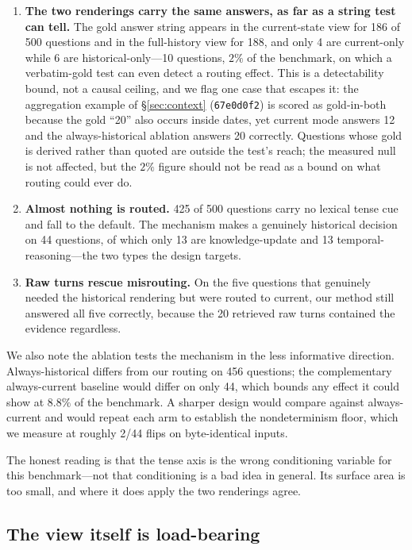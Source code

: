 \documentclass[11pt]{article}
\begin{document}
\begin{enumerate}
\item \textbf{The two renderings carry the same answers, as far as a string test can tell.} The gold answer string appears in the current-state view for 186 of 500 questions and in the full-history view for 188, and only 4 are current-only while 6 are historical-only---10 questions, $2\%$ of the benchmark, on which a verbatim-gold test can even detect a routing effect. This is a detectability bound, not a causal ceiling, and we flag one case that escapes it: the aggregation example of \S\ref{sec:context} (\texttt{67e0d0f2}) is scored as gold-in-both because the gold ``20'' also occurs inside dates, yet current mode answers 12 and the always-historical ablation answers 20 correctly. Questions whose gold is derived rather than quoted are outside the test's reach; the measured null is not affected, but the $2\%$ figure should not be read as a bound on what routing could ever do.
\item \textbf{Almost nothing is routed.} 425 of 500 questions carry no lexical tense cue and fall to the default. The mechanism makes a genuinely historical decision on 44 questions, of which only 13 are knowledge-update and 13 temporal-reasoning---the two types the design targets.
\item \textbf{Raw turns rescue misrouting.} On the five questions that genuinely needed the historical rendering but were routed to current, our method still answered all five correctly, because the 20 retrieved raw turns contained the evidence regardless.
\end{enumerate}

We also note the ablation tests the mechanism in the less informative direction. Always-historical differs from our routing on 456 questions; the complementary always-current baseline would differ on only 44, which bounds any effect it could show at $8.8\%$ of the benchmark. A sharper design would compare against always-current and would repeat each arm to establish the nondeterminism floor, which we measure at roughly 2/44 flips on byte-identical inputs.

The honest reading is that the tense axis is the wrong conditioning variable for this benchmark---not that conditioning is a bad idea in general. Its surface area is too small, and where it does apply the two renderings agree.

\subsection{The view itself is load-bearing}
\label{sec:view}
\end{document}
